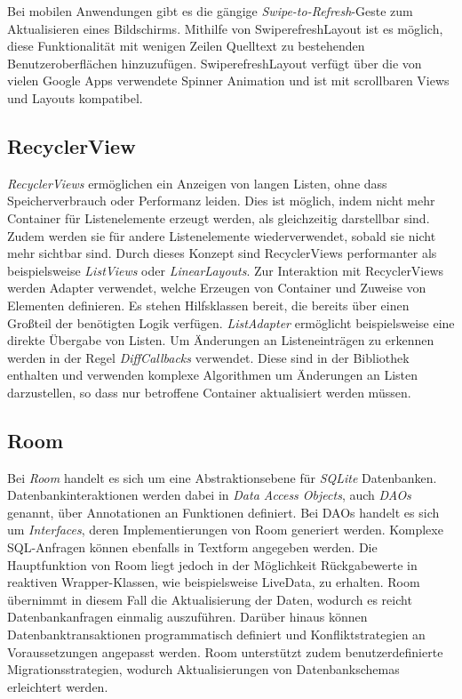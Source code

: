 Bei mobilen Anwendungen gibt es die gängige \textit{Swipe-to-Refresh}-Geste zum Aktualisieren eines Bildschirms.
Mithilfe von SwiperefreshLayout ist es möglich, diese Funktionalität mit wenigen Zeilen Quelltext zu bestehenden Benutzeroberflächen hinzuzufügen.
SwiperefreshLayout verfügt über die von vielen Google Apps verwendete Spinner Animation und ist mit scrollbaren Views und Layouts kompatibel.

\subsection{RecyclerView}
\label{subsec:app:jetpack:recyclerview}
\textit{RecyclerViews} ermöglichen ein Anzeigen von langen Listen, ohne dass Speicherverbrauch oder Performanz leiden.
Dies ist möglich, indem nicht mehr Container für Listenelemente erzeugt werden, als gleichzeitig darstellbar sind. 
Zudem werden sie für andere Listenelemente wiederverwendet, sobald sie nicht mehr sichtbar sind.
Durch dieses Konzept sind RecyclerViews performanter als beispielsweise \textit{ListViews} oder \textit{LinearLayouts}.
Zur Interaktion mit RecyclerViews werden Adapter verwendet, welche Erzeugen von Container und Zuweise von Elementen definieren.
Es stehen Hilfsklassen bereit, die bereits über einen Großteil der benötigten Logik verfügen.
\textit{ListAdapter} ermöglicht beispielsweise eine direkte Übergabe von Listen.
Um Änderungen an Listeneinträgen zu erkennen werden in der Regel \textit{DiffCallbacks} verwendet.
Diese sind in der Bibliothek enthalten und verwenden komplexe Algorithmen um Änderungen an Listen darzustellen, so dass nur betroffene Container aktualisiert werden müssen.

\subsection{Room}
\label{subsec:app:jetpack:room}
Bei \textit{Room} handelt es sich um eine Abstraktionsebene für \textit{SQLite} Datenbanken.
Datenbankinteraktionen werden dabei in \textit{Data Access Objects}, auch \textit{DAOs} genannt, über Annotationen an Funktionen definiert.
Bei DAOs handelt es sich um \textit{Interfaces}, deren Implementierungen von Room generiert werden.
Komplexe SQL-Anfragen können ebenfalls in Textform angegeben werden.
Die Hauptfunktion von Room liegt jedoch in der Möglichkeit Rückgabewerte in reaktiven Wrapper-Klassen, wie beispielsweise LiveData, zu erhalten.
Room übernimmt in diesem Fall die Aktualisierung der Daten, wodurch es reicht Datenbankanfragen einmalig auszuführen.
Darüber hinaus können Datenbanktransaktionen programmatisch definiert und Konfliktstrategien an Voraussetzungen angepasst werden.
Room unterstützt zudem benutzerdefinierte Migrationsstrategien, wodurch Aktualisierungen von Datenbankschemas erleichtert werden.

